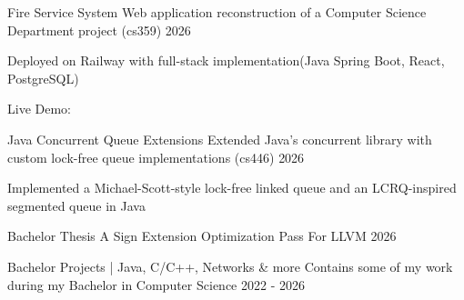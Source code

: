 \begin{cventries}

  \cvproject
    {Fire Service System} %
    {Web application reconstruction of a Computer Science Department project (cs359)} %
    {2026} %
    {
      \begin{cvitems} %
        \item {Deployed on Railway with full-stack implementation(Java Spring Boot, React, PostgreSQL)}
        \item {}
        \item {{Live Demo:} }
      \end{cvitems}
    }

  \cvproject
    {Java Concurrent Queue Extensions} %
    {Extended Java’s concurrent library with custom lock-free queue implementations (cs446)} %
    {2026} %
    {
      \begin{cvitems} %
        \item {Implemented a Michael-Scott-style lock-free linked queue and an LCRQ-inspired segmented queue in Java}
        \item {}
      \end{cvitems}
    }


  \cvproject
    {Bachelor Thesis} %
    {A Sign Extension Optimization Pass For LLVM} %
    {2026} %
    {
      \begin{cvitems} %
        \item {}
      \end{cvitems}
    }


  \cvproject
    {Bachelor Projects | Java, C/C++, Networks \& more} %
    {Contains some of my work during my Bachelor in Computer Science} %
    {2022 - 2026} %
    {
      \begin{cvitems} %
        \item {}
      \end{cvitems}
    }

\end{cventries}


